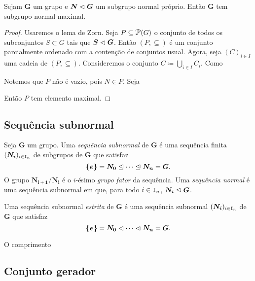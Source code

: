 \begin{conj}
Sejam $\bm G$ um grupo e $\bm N \mathrel{\lhd} \bm G$ um subgrupo normal próprio. Então $\bm G$ tem subgrupo normal maximal.
\end{conj}
\begin{proof}
Usaremos o lema de Zorn. Seja $P \subseteq \p(G)$ o conjunto de todos os subconjuntos $S \subset G$ tais que $\bm S \mathrel{\lhd} \bm G$. Então $(P,\subseteq)$ é um conjunto parcialmente ordenado com a contenção de conjuntos usual. Agora, seja $(C)_{i \in I}$ uma cadeia de $(P,\subseteq)$. Consideremos o conjunto $C \coloneqq \bigcup_{i \in I} C_i$. Como 

Notemos que $P$ não é vazio, pois $N \in P$. Seja 



Então $P$ tem elemento maximal.
\end{proof}






\subsection{Sequência subnormal}

\begin{defi}
Seja $\bm G$ um grupo. Uma \emph{sequência subnormal} de $\bm G$ é uma sequência finita $(\bm{N_i})_{i \in \mathtt I_n}$ de subgrupos de $\bm G$ que satisfaz
	\begin{equation*}
	\bm{\{e\}} = \bm{N_0} \mathrel{\unlhd} \cdots \mathrel{\unlhd} \bm{N_n} = \bm G.
	\end{equation*}
O grupo $\bm{N_{i+1}/N_i}$ é o $i$-ésimo \emph{grupo fator} da sequência.
Uma \emph{sequência normal} é uma sequência subnormal em que, para todo $i \in \mathtt I_n$, $\bm{N_i} \mathrel{\unlhd} \bm G$.

Uma sequência subnormal \emph{estrita} de $\bm G$ é uma sequência subnormal $(\bm{N_i})_{i \in \mathtt I_n}$ de $\bm G$ que satisfaz
	\begin{equation*}
	\bm{\{e\}} = \bm{N_0} \mathrel{\lhd} \cdots \mathrel{\lhd} \bm{N_n} = \bm G.
	\end{equation*}
	
O comprimento
\end{defi}



\subsection{Conjunto gerador}

